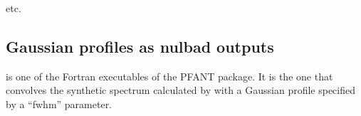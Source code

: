 \documentclass[letterpaper,10pt,english]{sphinxmanual}
\begin{document}
\begin{sphinxVerbatim}[commandchars=\\\{\}]
              \PYG{p}{[}\PYG{p}{]}
             \PYG{l+s+s2}{]}  
                  \PYG{p}{[}\PYG{l+s+s2}{]}\PYG{p}{]}
                  \PYG{p}{[}\PYG{p}{]}
\end{sphinxVerbatim}

\begin{figure}[htbp]
\centering

\noindent{}
\end{figure}

\begin{figure}[htbp]
\centering

\noindent{}
\end{figure}

etc.


\subsection{Gaussian profiles as nulbad outputs}
\label{\detokenize{pyfant:gaussian-profiles-as-nulbad-outputs}}
 is one of the Fortran executables of the PFANT package. It is the one that convolves
the synthetic spectrum calculated by  with a Gaussian profile specified by a “fwhm” parameter.
\end{document}
